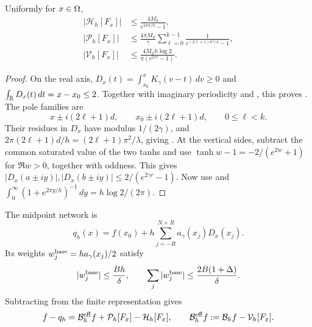 \begin{lemma}
\label{lem:tanhquad}
Uniformly for $x\in\Omega$,
\begin{align}
 |\mathcal H_h[F_x]|&\le\frac{4M_\sigma}{e^{2\pi\sigma/h}-1},
 \label{eq:Hbound}\\
 |\mathcal P_h[F_x]|&\le\frac{4\pi M_\sigma}\gamma
 \sum_{\ell=0}^{k-1}\frac1{e^{(2\ell+1)\pi^2/\lambda}-1},
 \label{eq:Pbound}\\
 |\mathcal V_h[F_x]|&\le\frac{4M_\sigma h\log2}{\pi(e^{2\gamma r}-1)}.
 \label{eq:Vbound}
\end{align}
\end{lemma}
\begin{proof}
On the real axis, $D_x(t)=\int_{x_0}^xK_\gamma(v-t)\,dv\ge0$ and
$\int_\mathbb R D_x(t)\,dt=x-x_0\le2$. Together with imaginary periodicity and
, this proves .
The pole families are
\[
 x\pm i(2\ell+1)d,\qquad x_0\pm i(2\ell+1)d,
 \qquad 0\le\ell<k.
\]
Their residues in $D_x$ have modulus $1/(2\gamma)$, and
$2\pi(2\ell+1)d/h=(2\ell+1)\pi^2/\lambda$, giving .
At the vertical sides, subtract the common saturated value of the two tanhs
and use $\tanh w-1=-2/(e^{2w}+1)$ for $\Re w>0$, together with oddness.
This gives $|D_x(a\pm iy)|,|D_x(b\pm iy)|\le2/(e^{2\gamma r}-1)$.
Now use  and
$\int_0^\infty(1+e^{2\pi y/h})^{-1}\,dy=h\log2/(2\pi)$.
\end{proof}
The midpoint network is
\begin{equation}
 q_h(x)=f(x_0)+h\sum_{j=-R}^{N+R}a_\gamma(x_j)D_x(x_j).
 \label{eq:baseline-network}
\end{equation}
Its weights $w_j^{\rm base}=ha_\gamma(x_j)/2$ satisfy
\begin{equation}
 |w_j^{\rm base}|\le\frac{Bh}\delta,\qquad
 \sum_j|w_j^{\rm base}|\le\frac{2B(1+\Delta)}\delta.
 \label{eq:baseline-coeff}
\end{equation}
Subtracting  from the finite representation gives
\begin{equation}
 f-q_h=\mathcal B_h^{\rm eff}f+\mathcal P_h[F_x]-\mathcal H_h[F_x],
 \qquad \mathcal B_h^{\rm eff}f:=\mathcal B_hf-\mathcal V_h[F_x].
 \label{eq:baseline-signed}
\end{equation}


